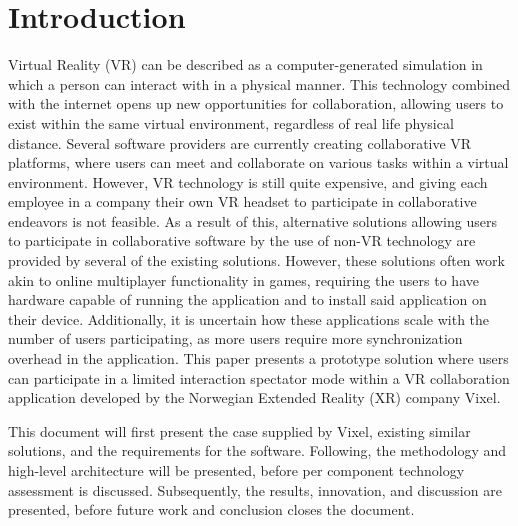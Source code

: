 \section{Introduction}
Virtual Reality (VR) can be described as a computer-generated simulation in which a person can interact with in a physical manner\cite{vr_definition}. This technology combined with the internet opens up new opportunities for collaboration, allowing users to exist within the same virtual environment, regardless of real life physical distance. Several software providers are currently creating collaborative VR platforms, where users can meet and collaborate on various tasks within a virtual environment. However, VR technology is still quite expensive, and giving each employee in a company their own VR headset to participate in collaborative endeavors is not feasible. As a result of this, alternative solutions allowing users to participate in collaborative software by the use of non-VR technology are provided by several of the existing solutions\cite{rumii_vr, insite_vr}. However, these solutions often work akin to online multiplayer functionality in games, requiring the users to have hardware capable of running the application and to install said application on their device. Additionally, it is uncertain how these applications scale with the number of users participating, as more users require more synchronization overhead in the application. This paper presents a prototype solution where users can participate in a limited interaction spectator mode within a VR collaboration application developed by the Norwegian Extended Reality (XR) company Vixel.

This document will first present the case supplied by Vixel, existing similar solutions, and the requirements for the software. Following, the methodology and high-level architecture will be presented, before per component technology assessment is discussed. Subsequently, the results, innovation, and discussion are presented, before future work and conclusion closes the document. 